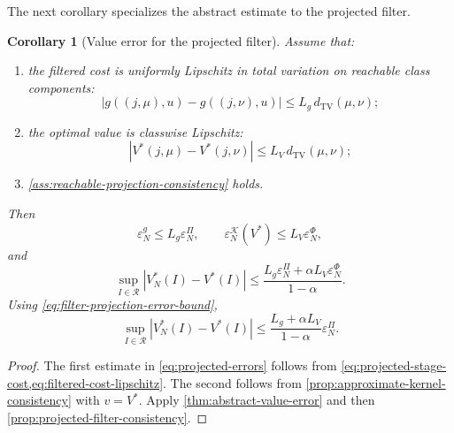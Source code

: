 \documentclass[10pt,twocolumn]{article}
\newtheorem{corollary}{Corollary}
\theoremstyle{remark}
\begin{document}
The next corollary specializes the abstract estimate to the projected filter.

\begin{corollary}[Value error for the projected filter]
	\label{cor:projected-filter-value-error}
	Assume that:
	\begin{enumerate}[label=\textnormal{(\roman*)},leftmargin=*]
		\item the filtered cost is uniformly Lipschitz in total variation on reachable class components:
		\begin{equation}
			|g((j,\mu),u)-g((j,\nu),u)|
			\leq
			L_g\,d_{\mathrm{TV}}(\mu,\nu);
			\label{eq:filtered-cost-lipschitz}
		\end{equation}
		\item the optimal value is classwise Lipschitz:
		\begin{equation*}
			|V^*(j,\mu)-V^*(j,\nu)|
			\leq
			L_V\,d_{\mathrm{TV}}(\mu,\nu);
			\label{eq:optimal-value-lipschitz}
		\end{equation*}
		\item \cref{ass:reachable-projection-consistency} holds.
	\end{enumerate}
	Then
	\begin{equation}
		\varepsilon_N^g
		\leq
		L_g\varepsilon_N^{\Pi},
		\qquad
		\varepsilon_N^{\mathcal K}(V^*)
		\leq
		L_V\varepsilon_N^{\Phi},
		\label{eq:projected-errors}
	\end{equation}
	and
	\begin{equation*}
		\sup_{I\in\mathcal R}
		|V_N^*(I)-V^*(I)|
		\leq
		\frac{
			L_g\varepsilon_N^{\Pi}
			+
			\alpha L_V\varepsilon_N^{\Phi}
		}{1-\alpha}.
		\label{eq:projected-value-error}
	\end{equation*}
	Using \cref{eq:filter-projection-error-bound},
	\begin{equation}
		\sup_{I\in\mathcal R}
		|V_N^*(I)-V^*(I)|
		\leq
		\frac{
			L_g+\alpha L_V
		}{1-\alpha}
		\varepsilon_N^{\Pi}.
		\label{eq:projection-only-value-error}
	\end{equation}
\end{corollary}

\begin{proof}
	The first estimate in \cref{eq:projected-errors} follows from \cref{eq:projected-stage-cost,eq:filtered-cost-lipschitz}. The second follows from \cref{prop:approximate-kernel-consistency} with \(v=V^*\). Apply \cref{thm:abstract-value-error} and then \cref{prop:projected-filter-consistency}.
\end{proof}
\end{document}
